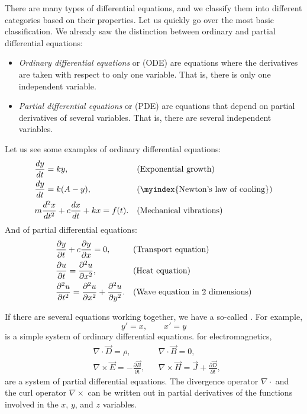 There are many types of differential equations, and we classify them into
different categories based on their properties.  Let us quickly go over
the most basic classification.  We already saw the distinction
between ordinary and partial differential equations:
\begin{itemize}
\item
\emph{Ordinary differential equations}
 or (ODE) are
equations where the derivatives are taken with respect to only one variable.
That is, there is only one independent variable.
\item
\emph{Partial differential equations}
 or (PDE) are
equations that depend on partial derivatives of several variables.
That is, there are several independent variables.
\end{itemize}

Let us see some examples of ordinary differential equations:
\begin{align*}
& \frac{d y}{dt} = ky , & & \text{(Exponential growth\index{exponential growth})} \\
& \frac{d y}{dt} = k(A-y) , & & \text{(\myindex{Newton's law of cooling})} \\
& m \frac{d^2 x}{dt^2} + c \frac{dx}{dt} + kx = f(t) . & &
\text{(Mechanical vibrations\index{mechanical vibrations})}
\end{align*}
And of partial differential equations:
\begin{align*}
& \frac{\partial y}{\partial t} + c \frac{\partial y}{\partial x} = 0 , & & 
\text{(Transport equation\index{transport equation})} \\
& \frac{\partial u}{\partial t} = \frac{\partial^2 u}{\partial x^2} , & & 
\text{(Heat equation\index{heat equation})} \\
& \frac{\partial^2 u}{\partial t^2} = \frac{\partial^2 u}{\partial x^2} +
\frac{\partial^2 u}{\partial y^2} . & & 
\text{(Wave equation in 2 dimensions\index{wave equation in 2 dimensions})}
\end{align*}

If there are several equations working together, we have a so-called
\emph{}.  For example,
\begin{equation*}
y' = x , \qquad x' = y
\end{equation*}
is a simple system of ordinary differential equations.
 for electromagnetics,
\begin{align*}
& \nabla \cdot \vec{D} = \rho, & & \nabla \cdot \vec{B} = 0 , \\
& \nabla \times \vec{E} = - \frac{\partial \vec{B}}{\partial t}, &
& \nabla \times \vec{H} = \vec{J} + \frac{\partial \vec{D}}{\partial t} ,
\end{align*}
are a system of partial differential equations. 
The divergence operator $\nabla \cdot$ and the
curl operator $\nabla \times$ can be written out in partial derivatives of
the functions involved in the $x$, $y$, and $z$ variables.

